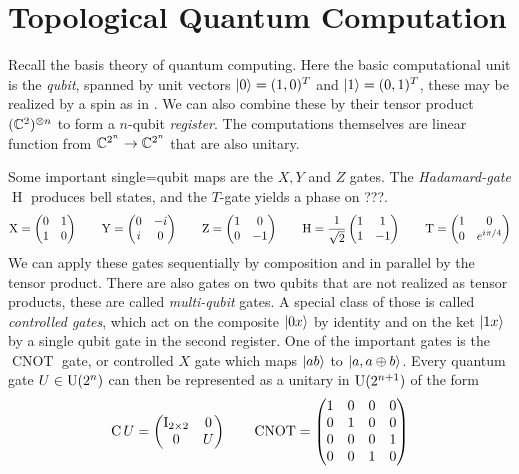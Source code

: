 \section{Topological Quantum Computation}\label{sect:anyon:tqc}

Recall the basis theory of quantum computing. Here the basic computational unit
is the \emph{qubit}, spanned by unit vectors $\left| 0 \right\rangle = (1,0)^T$ and $\left| 1 \right\rangle =
(0,1)^T$, these may be realized by a spin as in
. We can also combine these by their tensor
product $(\mathbb{C}^2)^{\otimes n}$ to form a $n$-qubit \emph{register}. The computations
themselves are linear function from $\mathbb{C}^{2^n} \to \mathbb{C}^{2^n}$ that are also
unitary.

Some important single=qubit maps are the $X,Y$ and $Z$ gates. The
\emph{Hadamard-gate} $\mathop{H}$ produces bell states, and the $T$-gate yields a phase on ???.
\begin{equation}
  \operatorname{X} = \begin{pmatrix}
    0 & 1 \\ 1 & 0
  \end{pmatrix}
  \qquad
  \operatorname{Y} = \begin{pmatrix}
    0 & -i \\ i & 0
  \end{pmatrix}
  \qquad
  \operatorname{Z} = 
  \begin{pmatrix}
    1 & 0 \\ 0 & -1
  \end{pmatrix}
  \qquad
  \operatorname{H} =
  \frac{1}{\sqrt{2}}
  \begin{pmatrix}
    1 & 1 \\ 1 & -1
  \end{pmatrix}
  \qquad
  \operatorname{T} =
  \begin{pmatrix}
    1 & 0 \\ 0 & e^{i\pi / 4}
  \end{pmatrix}
\end{equation}
We can apply these gates sequentially by composition and in parallel by the
tensor product. There are also gates on two qubits that are not realized as
tensor products, these are called \emph{multi-qubit} gates. A special class of
those is called \emph{controlled gates}, which act on the composite $\left| 0x \right\rangle$
by identity and on the ket $\left| 1x \right\rangle$ by a single qubit gate in the second
register. One of the important gates is the $\mathop{CNOT}$ gate, or controlled
$X$ gate which maps $\left| ab \right\rangle$ to $\left| a,a\oplus b \right\rangle$. Every quantum gate $U \in
\mathrm{U}(2^n)$ can then be represented as a unitary in $\mathrm{U}(2^{n+1})$  of the form 
\[
  \operatorname{C}U = \begin{pmatrix}
    \operatorname{I}_{2\times 2} & 0 \\ 0 & U
  \end{pmatrix} \qquad \operatorname{CNOT} = \begin{pmatrix}
    1 & 0 & 0 & 0 \\
    0 & 1 & 0 & 0 \\
    0 & 0 & 0 & 1 \\
    0 & 0 & 1 & 0
  \end{pmatrix}
\]

